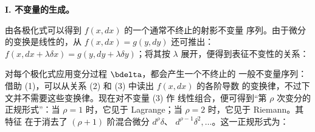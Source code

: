 \begin{center}
\textbf{I. 不变量的生成。}
\end{center}

由各极化式可以得到 \(f(x,dx)\) 的一个通常不终止的射影不变量
序列。由于微分的变换是线性的，从 \(f(x,dx)=g(y,dy)\) 还可推出：
\(f(x,dx+\lambda\delta x)=g(y,dy+\lambda\delta y)\)；将其按
\(\lambda\) 展开，便得到表征不变性的关系：

对每个极化式应用变分过程 \(\bdelta\)，都会产生一个不终止的
一般不变量序列：
借助 (1)，可以从关系 (2) 和 (3) 中读出 \(f(x,dx)\) 的各阶导数
的变换律，不过下文并不需要这些变换律。现在对不变量 (3) 作
线性组合，便可得到“第 \(\rho\) 次变分的正规形式”：当 \(\rho=1\)
时，它见于 Lagrange；当 \(\rho=2\) 时，它见于 Riemann。其特征
在于消去了 \((\rho+1)\) 阶混合微分 \(d^\rho\delta\)、
\(d^{\rho-1}\delta^2,\ldots\)。这一正规形式为：

